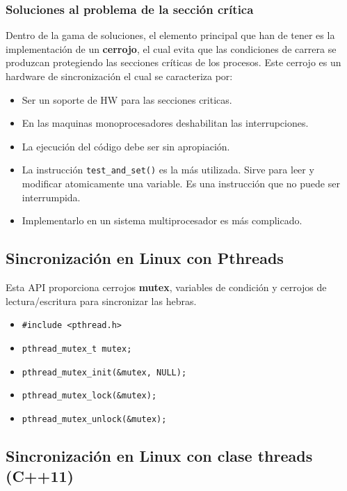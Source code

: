 \documentclass{templateNote}
\begin{document}
\subsubsection*{Soluciones al problema de la sección crítica}

Dentro de la gama de soluciones, el elemento principal que han de tener es la implementación de un \textbf{cerrojo}, el cual evita que las condiciones de carrera se produzcan protegiendo las secciones críticas de los procesos.
Este cerrojo es un hardware de sincronización el cual se caracteriza por:
\begin{itemize}
    \item Ser un soporte de HW para las secciones criticas.
    \item En las maquinas monoprocesadores deshabilitan las interrupciones.
    \item La ejecución del código debe ser sin apropiación.
    \item La instrucción \texttt{test\_and\_set()} es la más utilizada. Sirve para leer y modificar atomicamente una variable. Es una instrucción que no puede ser interrumpida.
    \item Implementarlo en un sistema multiprocesador es más complicado.
\end{itemize}

\subsection*{Sincronización en Linux con Pthreads}

Esta API proporciona cerrojos \textbf{mutex}, variables de condición y cerrojos de lectura/escritura para sincronizar las hebras.

\begin{itemize}
    \item \texttt{\#include \textless{}pthread.h\textgreater{}}
    \item \texttt{pthread\_mutex\_t mutex;}
    \item \texttt{pthread\_mutex\_init(\&mutex, NULL);}
    \item \texttt{pthread\_mutex\_lock(\&mutex);}
    \item \texttt{pthread\_mutex\_unlock(\&mutex);}
\end{itemize}

\subsection*{Sincronización en Linux con clase threads (C++11)}
\end{document}
